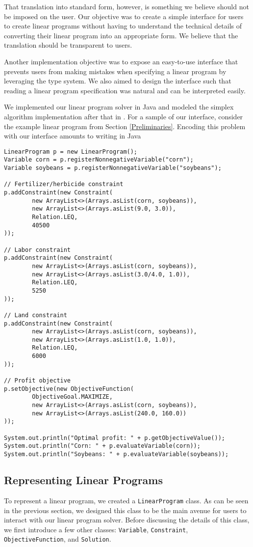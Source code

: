 \documentclass{article}
\newcommand{\javaCode}[1]{\texttt{#1}}
\begin{document}
That translation into standard form, however, is something we believe should not be imposed on the user. Our objective was to create a simple interface for users to create linear programs without having to understand the technical details of converting their linear program into an appropriate form. We believe that the translation should be transparent to users. 

Another implementation objective was to expose an easy-to-use interface that prevents users from making mistakes when specifying a linear program by leveraging the type system. We also aimed to design the interface such that reading a linear program specification was natural and can be interpreted easily. 

We implemented our linear program solver in Java and modeled the simplex algorithm implementation after that in \cite{CLRS}. For a sample of our interface, consider the example linear program from Section \ref{Preliminaries}. Encoding this problem with our interface amounts to writing in Java
\begin{verbatim}
LinearProgram p = new LinearProgram();
Variable corn = p.registerNonnegativeVariable("corn");
Variable soybeans = p.registerNonnegativeVariable("soybeans");

// Fertilizer/herbicide constraint
p.addConstraint(new Constraint(
        new ArrayList<>(Arrays.asList(corn, soybeans)),
        new ArrayList<>(Arrays.asList(9.0, 3.0)),
        Relation.LEQ,
        40500
));

// Labor constraint
p.addConstraint(new Constraint(
        new ArrayList<>(Arrays.asList(corn, soybeans)),
        new ArrayList<>(Arrays.asList(3.0/4.0, 1.0)),
        Relation.LEQ,
        5250
));

// Land constraint
p.addConstraint(new Constraint(
        new ArrayList<>(Arrays.asList(corn, soybeans)),
        new ArrayList<>(Arrays.asList(1.0, 1.0)),
        Relation.LEQ,
        6000
));

// Profit objective
p.setObjective(new ObjectiveFunction(
        ObjectiveGoal.MAXIMIZE,
        new ArrayList<>(Arrays.asList(corn, soybeans)),
        new ArrayList<>(Arrays.asList(240.0, 160.0))
));

System.out.println("Optimal profit: " + p.getObjectiveValue());
System.out.println("Corn: " + p.evaluateVariable(corn));
System.out.println("Soybeans: " + p.evaluateVariable(soybeans));
\end{verbatim}

\subsection{Representing Linear Programs}
To represent a linear program, we created a \javaCode{LinearProgram} class. As can be seen in the previous section, we designed this class to be the main avenue for users to interact with our linear program solver. Before discussing the details of this class, we first introduce a few other classes: \javaCode{Variable}, \javaCode{Constraint}, \javaCode{ObjectiveFunction}, and \javaCode{Solution}.
\end{document}
